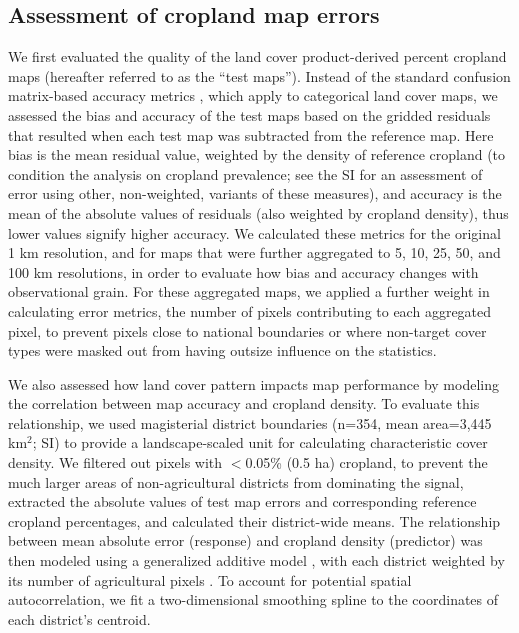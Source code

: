 \documentclass[12 pt, titlepage, a4paper]{article}
\begin{document}
\subsection*{Assessment of cropland map errors}
\vspace{-0.2 cm}
We first evaluated the quality of the land cover product-derived percent cropland maps (hereafter referred to as the ``test maps''). Instead of the standard confusion matrix-based accuracy metrics \citep{olofsson_good_2014,olofsson_making_2013}, which apply to categorical land cover maps, we assessed the bias and accuracy of the test maps based on the gridded residuals that resulted when each test map was subtracted from the reference map. Here bias is the mean residual value, weighted by the density of reference cropland (to condition the analysis on cropland prevalence; see the SI for an assessment of error using other, non-weighted, variants of these measures), and accuracy is the mean of the absolute values of residuals (also weighted by cropland density), thus lower values signify higher accuracy. We calculated these metrics for the original 1 km resolution, and for maps that were further aggregated to 5, 10, 25, 50, and 100 km resolutions, in order to evaluate how bias and accuracy changes with observational grain. For these aggregated maps, we applied a further weight in calculating error metrics, the number of pixels contributing to each aggregated pixel, to prevent pixels close to national boundaries or where non-target cover types were masked out from having outsize influence on the statistics. 

We also assessed how land cover pattern impacts map performance by modeling the correlation between map accuracy and cropland density.  To evaluate this relationship, we used magisterial district boundaries (n=354, mean area=3,445 km$^2$; SI) to provide a landscape-scaled unit for calculating characteristic cover density. We filtered out pixels with $<$0.05\% (0.5 ha) cropland, to prevent the much larger areas of non-agricultural districts from dominating the signal, extracted the absolute values of test map errors and corresponding reference cropland percentages, and calculated their district-wide means. The relationship between mean absolute error (response) and cropland density (predictor) was then modeled using a generalized additive model \citep{hastie_generalized_1990}, with each district weighted by its number of agricultural pixels \citep{wood_mgcv:_2001}. To account for potential spatial autocorrelation, we fit a two-dimensional smoothing spline to the coordinates of each district's centroid.
\end{document}
